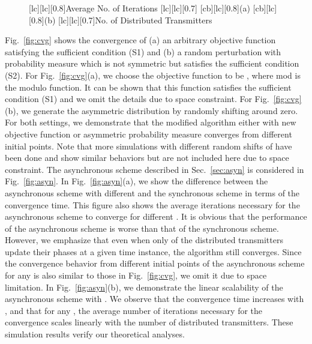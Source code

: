 \documentclass{article}
\begin{document}
\begin{figure}[tb]
[lc][lc][0.8]{Average No. of Iterations}
[lc][lc][0.7]{}
[cb][lc][0.8]{(a)}
[cb][lc][0.8]{(b)}
[lc][lc][0.7]{No. of Distributed Transmitters}
\end{figure}
Fig.~\ref{fig:cvg} shows the convergence of (a) an arbitrary objective function satisfying the sufficient condition (S1) and (b) a random perturbation with probability measure which is not symmetric but satisfies the sufficient condition (S2). For Fig.~\ref{fig:cvg}(a), we choose the objective function to be , where mod is the modulo function.  
It can be shown that this function satisfies the sufficient condition (S1) and we omit the details due to space constraint. 
For Fig.~\ref{fig:cvg}(b), we generate the asymmetric distribution by randomly shifting  around zero. For both settings, we demonstrate that the modified algorithm either with new objective function or asymmetric probability measure converges from different initial points. Note that more simulations with different random shifts of  have been done and show similar behaviors but are not included here due to space constraint. The asynchronous scheme described in Sec.~\ref{sec:asyn} is considered in Fig.~\ref{fig:asyn}. In Fig.~\ref{fig:asyn}(a), we show the difference between the asynchronous scheme with different  and the synchronous scheme in terms of the convergence time. This figure also shows the average iterations necessary for the asynchronous scheme to converge for different . It is obvious that the performance of the asynchronous scheme is worse than that of the synchronous scheme. However, we emphasize that even when only  of the distributed transmitters update their phases at a given time instance, the algorithm still converges. Since the convergence behavior from different initial points of the asynchronous scheme for any  is also similar to those in Fig.~\ref{fig:cvg}, we omit it due to space limitation. In Fig.~\ref{fig:asyn}(b), we demonstrate the linear scalability of the asynchronous scheme with . We observe that the convergence time increases with , and that for any , the average number of iterations necessary for the convergence scales linearly with the number of distributed transmitters. These simulation results verify our theoretical analyses.
\end{document}
